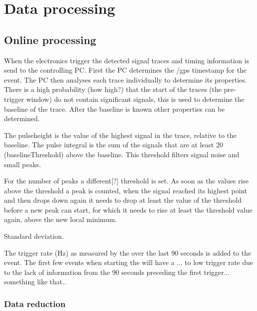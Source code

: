 \chapter{Data processing}
\label{ch:data_processing}

\section{Online processing}

When the \hisparc electronics trigger the detected signal traces and timing information is send to the controlling PC. First the PC determines the /gps timestamp for the event. The PC then analyses each trace individually to determine its properties. There is a high probability (how high?) that the start of the traces (the pre-trigger window) do not contain significant signals, this is used to determine the baseline of the trace. After the baseline is known other properties can be determined.

The pulseheight is the value of the highest signal in the trace, relative to the baseline. The pulse integral is the sum of the signals that are at least \SI{20}{\adc} (baselineThreshold) above the baseline. This threshold filters signal noise and small peaks.

For the number of peaks a different[?] threshold is set. As soon as the values rise above the threshold a peak is counted, when the signal reached its highest point and then drops down again it needs to drop at least the value of the threshold before a new peak can start, for which it needs to rise at least the threshold value again, above the new local minimum.

Standard deviation.

The trigger rate (Hz) as measured by the \daq over the last 90 seconds is added to the event. The first few events when starting the \daq will have a ... to low trigger rate due to the lack of information from the 90 seconds preceding the first trigger... something like that..


\subsection{Data reduction}

\cite{oostenbrugge2014}

